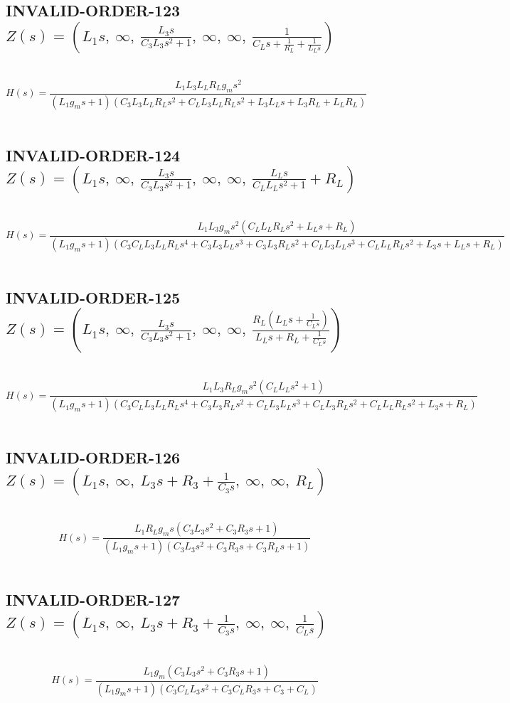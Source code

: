\documentclass{article}
\begin{document}
\subsection{INVALID-ORDER-123 $Z(s) = \left( L_{1} s, \  \infty, \  \frac{L_{3} s}{C_{3} L_{3} s^{2} + 1}, \  \infty, \  \infty, \  \frac{1}{C_{L} s + \frac{1}{R_{L}} + \frac{1}{L_{L} s}}\right)$ } \ 
\textbf{\[H(s) = \frac{L_{1} L_{3} L_{L} R_{L} g_{m} s^{2}}{\left(L_{1} g_{m} s + 1\right) \left(C_{3} L_{3} L_{L} R_{L} s^{2} + C_{L} L_{3} L_{L} R_{L} s^{2} + L_{3} L_{L} s + L_{3} R_{L} + L_{L} R_{L}\right)}\] } \ 
\subsection{INVALID-ORDER-124 $Z(s) = \left( L_{1} s, \  \infty, \  \frac{L_{3} s}{C_{3} L_{3} s^{2} + 1}, \  \infty, \  \infty, \  \frac{L_{L} s}{C_{L} L_{L} s^{2} + 1} + R_{L}\right)$ } \ 
\textbf{\[H(s) = \frac{L_{1} L_{3} g_{m} s^{2} \left(C_{L} L_{L} R_{L} s^{2} + L_{L} s + R_{L}\right)}{\left(L_{1} g_{m} s + 1\right) \left(C_{3} C_{L} L_{3} L_{L} R_{L} s^{4} + C_{3} L_{3} L_{L} s^{3} + C_{3} L_{3} R_{L} s^{2} + C_{L} L_{3} L_{L} s^{3} + C_{L} L_{L} R_{L} s^{2} + L_{3} s + L_{L} s + R_{L}\right)}\] } \ 
\subsection{INVALID-ORDER-125 $Z(s) = \left( L_{1} s, \  \infty, \  \frac{L_{3} s}{C_{3} L_{3} s^{2} + 1}, \  \infty, \  \infty, \  \frac{R_{L} \left(L_{L} s + \frac{1}{C_{L} s}\right)}{L_{L} s + R_{L} + \frac{1}{C_{L} s}}\right)$ } \ 
\textbf{\[H(s) = \frac{L_{1} L_{3} R_{L} g_{m} s^{2} \left(C_{L} L_{L} s^{2} + 1\right)}{\left(L_{1} g_{m} s + 1\right) \left(C_{3} C_{L} L_{3} L_{L} R_{L} s^{4} + C_{3} L_{3} R_{L} s^{2} + C_{L} L_{3} L_{L} s^{3} + C_{L} L_{3} R_{L} s^{2} + C_{L} L_{L} R_{L} s^{2} + L_{3} s + R_{L}\right)}\] } \ 
\subsection{INVALID-ORDER-126 $Z(s) = \left( L_{1} s, \  \infty, \  L_{3} s + R_{3} + \frac{1}{C_{3} s}, \  \infty, \  \infty, \  R_{L}\right)$ } \ 
\textbf{\[H(s) = \frac{L_{1} R_{L} g_{m} s \left(C_{3} L_{3} s^{2} + C_{3} R_{3} s + 1\right)}{\left(L_{1} g_{m} s + 1\right) \left(C_{3} L_{3} s^{2} + C_{3} R_{3} s + C_{3} R_{L} s + 1\right)}\] } \ 
\subsection{INVALID-ORDER-127 $Z(s) = \left( L_{1} s, \  \infty, \  L_{3} s + R_{3} + \frac{1}{C_{3} s}, \  \infty, \  \infty, \  \frac{1}{C_{L} s}\right)$ } \ 
\textbf{\[H(s) = \frac{L_{1} g_{m} \left(C_{3} L_{3} s^{2} + C_{3} R_{3} s + 1\right)}{\left(L_{1} g_{m} s + 1\right) \left(C_{3} C_{L} L_{3} s^{2} + C_{3} C_{L} R_{3} s + C_{3} + C_{L}\right)}\] } \ 
\end{document}
